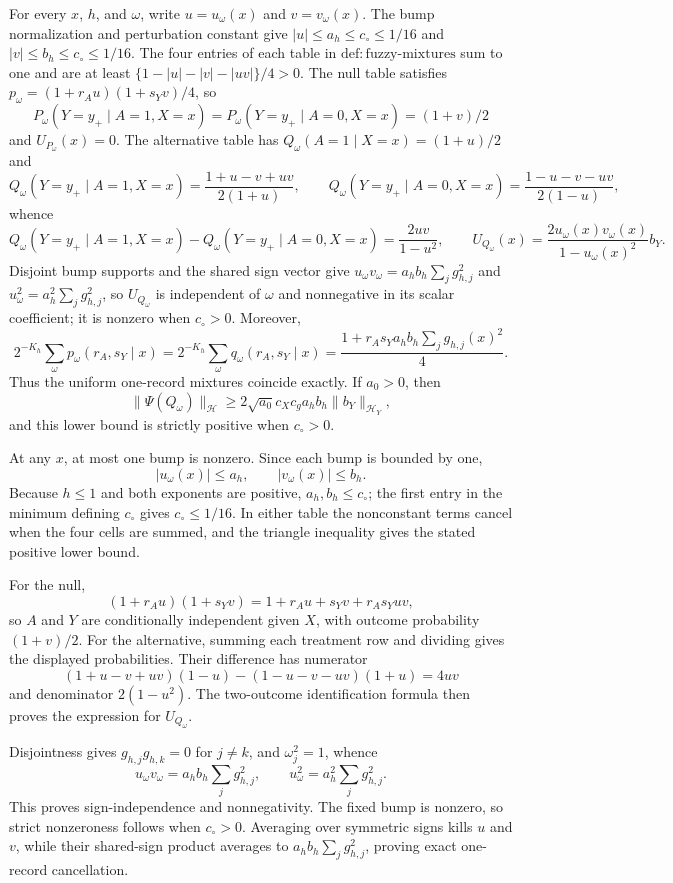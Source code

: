 For every \(x\), \(h\), and \(\omega\), write \(u=u_\omega(x)\) and \(v=v_\omega(x)\). The bump normalization and perturbation constant give \(|u|\le a_h\le c_\circ\le1/16\) and \(|v|\le b_h\le c_\circ\le1/16\). The four entries of each table in \(\mathrm{def{:}fuzzy\mbox{-}mixtures}\) sum to one and are at least \(\{1-|u|-|v|-|uv|\}/4>0\). The null table satisfies \(p_\omega=(1+r_Au)(1+s_Yv)/4\), so
\[
P_\omega(Y=y_+\mid A=1,X=x)=P_\omega(Y=y_+\mid A=0,X=x)=(1+v)/2
\]
and \(U_{P_\omega}(x)=0\). The alternative table has \(Q_\omega(A=1\mid X=x)=(1+u)/2\) and
\[
Q_\omega(Y=y_+\mid A=1,X=x)=\frac{1+u-v+uv}{2(1+u)},\qquad
Q_\omega(Y=y_+\mid A=0,X=x)=\frac{1-u-v-uv}{2(1-u)},
\]
whence
\[
Q_\omega(Y=y_+\mid A=1,X=x)-Q_\omega(Y=y_+\mid A=0,X=x)
=\frac{2uv}{1-u^2},\qquad
U_{Q_\omega}(x)=\frac{2u_\omega(x)v_\omega(x)}{1-u_\omega(x)^2}b_Y.
\]
Disjoint bump supports and the shared sign vector give \(u_\omega v_\omega=a_hb_h\sum_jg_{h,j}^2\) and \(u_\omega^2=a_h^2\sum_jg_{h,j}^2\), so \(U_{Q_\omega}\) is independent of \(\omega\) and nonnegative in its scalar coefficient; it is nonzero when \(c_\circ>0\). Moreover,
\[
2^{-K_h}\sum_\omega p_\omega(r_A,s_Y\mid x)
=2^{-K_h}\sum_\omega q_\omega(r_A,s_Y\mid x)
=\frac{1+r_As_Ya_hb_h\sum_jg_{h,j}(x)^2}{4}.
\]
Thus the uniform one-record mixtures coincide exactly. If \(a_0>0\), then
\[
\|\Psi(Q_\omega)\|_{\mathcal H}
\ge2\sqrt{a_0}c_Xc_ga_hb_h\|b_Y\|_{\mathcal H_Y},
\]
and this lower bound is strictly positive when \(c_\circ>0\).

At any \(x\), at most one bump is nonzero. Since each bump is bounded by one,
\[
|u_\omega(x)|\le a_h,\qquad |v_\omega(x)|\le b_h.
\]
Because \(h\le1\) and both exponents are positive, \(a_h,b_h\le c_\circ\); the first entry in the minimum defining \(c_\circ\) gives \(c_\circ\le1/16\). In either table the nonconstant terms cancel when the four cells are summed, and the triangle inequality gives the stated positive lower bound.

For the null,
\[
(1+r_Au)(1+s_Yv)=1+r_Au+s_Yv+r_As_Yuv,
\]
so \(A\) and \(Y\) are conditionally independent given \(X\), with outcome probability \((1+v)/2\). For the alternative, summing each treatment row and dividing gives the displayed probabilities. Their difference has numerator
\[
(1+u-v+uv)(1-u)-(1-u-v-uv)(1+u)=4uv
\]
and denominator \(2(1-u^2)\). The two-outcome identification formula then proves the expression for \(U_{Q_\omega}\).

Disjointness gives \(g_{h,j}g_{h,k}=0\) for \(j\ne k\), and \(\omega_j^2=1\), whence
\[
u_\omega v_\omega=a_hb_h\sum_jg_{h,j}^2,\qquad
u_\omega^2=a_h^2\sum_jg_{h,j}^2.
\]
This proves sign-independence and nonnegativity. The fixed bump is nonzero, so strict nonzeroness follows when \(c_\circ>0\). Averaging over symmetric signs kills \(u\) and \(v\), while their shared-sign product averages to \(a_hb_h\sum_jg_{h,j}^2\), proving exact one-record cancellation.

